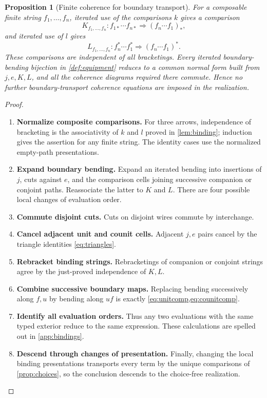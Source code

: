 \documentclass[11pt,reqno]{amsart}
\theoremstyle{plain}
\newtheorem{proposition}[theorem]{Proposition}
\theoremstyle{definition}
\theoremstyle{remark}
\numberwithin{equation}{section}
\newcommand{\cell}{\mathrel{\Longrightarrow}}
\begin{document}
\begin{proposition}[Finite coherence for boundary transport]\label{prop:transportcoherence}
For a composable finite string $f_1,\ldots,f_n$, iterated use of the
comparisons $k$ gives a comparison
\[
 K_{f_1,\ldots,f_n}:
 f_{1*}\cdots f_{n*}\cell(f_n\cdots f_1)_*,
\]
and iterated use of $l$ gives
\[
 L_{f_1,\ldots,f_n}:
 f_n^*\cdots f_1^*\cell(f_n\cdots f_1)^*.
\]
These comparisons are independent of all bracketings. Every iterated
boundary-bending bijection in \cref{def:equipment} reduces to a common
normal form built from $j,e,K,L$, and all the coherence diagrams required
there commute. Hence no further boundary-transport coherence equations
are imposed in the realization.
\end{proposition}
\begin{proof}\leavevmode
\begin{enumerate}
\item \textbf{Normalize composite comparisons.} For three arrows, independence of bracketing is the associativity of $k$
and $l$ proved in \cref{lem:binding}; induction gives the assertion for
any finite string. The identity cases use the normalized empty-path
presentations.

\item \textbf{Expand boundary bending.} Expand an iterated bending into insertions of $j$, cuts
against $e$, and the comparison cells joining successive companion or
conjoint paths. Reassociate the latter to $K$ and $L$. There are four
possible local changes of evaluation order.

\item \textbf{Commute disjoint cuts.} Cuts on disjoint wires commute
by interchange.

\item \textbf{Cancel adjacent unit and counit cells.} Adjacent $j,e$ pairs cancel by the triangle identities
\cref{eq:triangles}.

\item \textbf{Rebracket binding strings.} Rebracketings of companion or conjoint strings agree
by the just-proved independence of $K,L$.

\item \textbf{Combine successive boundary maps.} Replacing bending successively
along $f,u$ by bending along $uf$ is exactly
\cref{eq:unitcomp,eq:counitcomp}.

\item \textbf{Identify all evaluation orders.} Thus any two evaluations with the same
typed exterior reduce to the same expression. These calculations are
spelled out in \cref{app:bindings}.

\item \textbf{Descend through changes of presentation.} Finally, changing the local binding
presentations transports every term by the unique comparisons of
\cref{prop:choices}, so the conclusion descends to the choice-free
realization.\qedhere
\end{enumerate}
\end{proof}
\end{document}
